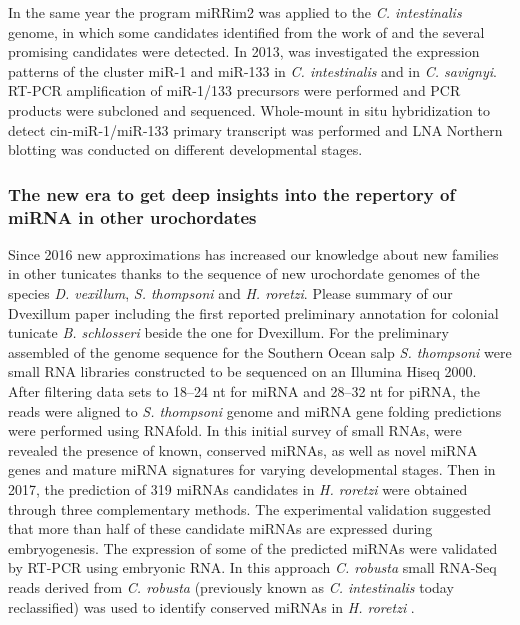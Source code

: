 \documentclass[graybox]{svmult}
\begin{document}
In the same year the program miRRim2 \cite{Terai2012} was applied to the \textit{C. intestinalis} genome, in which some candidates identified from the work of \cite{Hendrix2010} and the several promising candidates were detected. In 2013, \cite{Kusakabe2013} was investigated the expression patterns of the cluster miR-1 and miR-133 in \textit{C. intestinalis} and in \textit{C. savignyi}. RT-PCR amplification of miR-1/133 precursors were performed and PCR products were subcloned and sequenced. Whole-mount in situ hybridization to detect cin-miR-1/miR-133 primary transcript was performed and LNA Northern blotting was conducted on different developmental stages. 

\subsubsection{The new era to get deep insights into the repertory of miRNA in other urochordates}

Since 2016 new approximations has increased our knowledge about new families in other tunicates thanks to the sequence of new urochordate genomes of the species \textit{D. vexillum}, \textit{S. thompsoni} and \textit{H. roretzi}. Please summary of our Dvexillum paper \cite{Velandia-Huerto2016} including the first reported preliminary annotation for colonial tunicate \textit{B. schlosseri} beside the one for Dvexillum. For the preliminary assembled of the genome sequence for the Southern Ocean salp \textit{S. thompsoni} \cite{Jue2016} were  small RNA libraries constructed to be sequenced on an Illumina Hiseq 2000. After filtering data sets to 18--24 nt for miRNA and 28--32 nt for piRNA, the reads were aligned to \textit{S. thompsoni} genome and miRNA gene folding predictions were performed using RNAfold. In this initial survey of small RNAs, were revealed the presence of known, conserved miRNAs, as well as novel miRNA genes and mature miRNA signatures for varying developmental stages. Then in 2017, the prediction of 319 miRNAs candidates in  \textit{H. roretzi} were obtained through three complementary methods. The experimental validation suggested that more than half of these candidate miRNAs are expressed during embryogenesis. The expression of some of the predicted miRNAs were validated by RT-PCR using embryonic RNA. In this approach \textit{C. robusta}  small RNA-Seq reads derived from \textit{C. robusta} \cite{Shi2009} (previously known as  \textit{C. intestinalis} today reclassified) was used to identify conserved miRNAs in \textit{H. roretzi} \cite{Wang2017} .  
\end{document}
